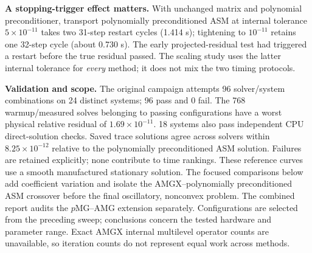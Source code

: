 \textbf{A stopping-trigger effect matters.}
With unchanged matrix and polynomial preconditioner, transport polynomially preconditioned ASM
at internal tolerance $5\times10^{-11}$ takes two 31-step restart cycles
(1.414 s); tightening to $10^{-11}$ retains one 32-step cycle (about 0.730 s).
The early projected-residual test had triggered a restart before the true
residual passed.  The scaling study uses the latter internal tolerance for
\emph{every} method; it does not mix the two timing protocols.

\textbf{Validation and scope.}
The original campaign attempts 96 solver/system combinations on 24 distinct systems; 96 pass and 0 fail. The 768 warmup/measured solves belonging to passing configurations have a worst physical relative residual of $1.69\times10^{-11}$. 18 systems also pass independent CPU direct-solution checks. Saved trace solutions agree across solvers within $8.25\times10^{-12}$ relative to the polynomially preconditioned ASM solution.
Failures are retained explicitly; none contribute to time rankings.
These reference curves use a smooth manufactured stationary solution.
The focused comparisons below add coefficient variation and isolate the
AMGX--polynomially preconditioned ASM crossover before the final oscillatory, nonconvex problem.
The combined report audits the $p$MG--AMG extension separately.
Configurations are selected from the preceding sweep; conclusions concern
the tested hardware and parameter range.  Exact AMGX internal multilevel
operator counts are unavailable, so iteration counts do not represent equal
work across methods.
